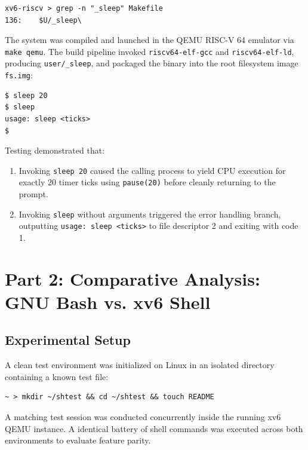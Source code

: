 \documentclass[12pt,a4paper]{article}
\begin{document}
\begin{lstlisting}[style=consolestyle, caption={UPROGS entry in Makefile}]
xv6-riscv > grep -n "_sleep" Makefile
136:	$U/_sleep\
\end{lstlisting}

The system was compiled and launched in the QEMU RISC-V 64 emulator via \texttt{make qemu}. The build pipeline invoked \texttt{riscv64-elf-gcc} and \texttt{riscv64-elf-ld}, producing \texttt{user/\_sleep}, and packaged the binary into the root filesystem image \texttt{fs.img}:

\begin{lstlisting}[style=consolestyle, caption={xv6 compilation and test execution in QEMU}]
$ sleep 20
$ sleep
usage: sleep <ticks>
$
\end{lstlisting}
Testing demonstrated that:
\begin{enumerate}
    \item Invoking \texttt{sleep 20} caused the calling process to yield CPU execution for exactly 20 timer ticks using \texttt{pause(20)} before cleanly returning to the prompt.
    \item Invoking \texttt{sleep} without arguments triggered the error handling branch, outputting \texttt{usage: sleep <ticks>} to file descriptor 2 and exiting with code 1.
\end{enumerate}

\section{Part 2: Comparative Analysis: GNU Bash vs. xv6 Shell}

\subsection{Experimental Setup}
A clean test environment was initialized on Linux in an isolated directory containing a known test file:
\begin{lstlisting}[style=consolestyle]
~ > mkdir ~/shtest && cd ~/shtest && touch README
\end{lstlisting}

A matching test session was conducted concurrently inside the running xv6 QEMU instance. A identical battery of shell commands was executed across both environments to evaluate feature parity.
\end{document}
